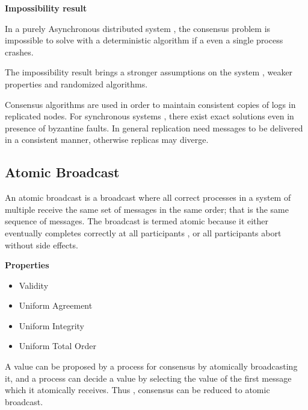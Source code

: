 \documentclass{article}
\begin{document}
\vspace{3mm}
\textbf{Impossibility result}

In a purely Asynchronous distributed system , the consensus problem is impossible to solve with a deterministic algorithm if a even a single process crashes.

The impossibility result brings a stronger assumptions on the system , weaker properties and randomized algorithms.

Consensus algorithms are used in order to maintain consistent copies of logs in replicated nodes. For synchronous systems , there exist exact solutions even in presence of byzantine faults.
In general replication need messages to be delivered in a consistent manner, otherwise replicas may diverge.

\subsection{Atomic Broadcast}

An atomic broadcast is a broadcast where all correct processes in a system of multiple receive the same set of messages in the same order; that is the same sequence of messages.
The broadcast is termed atomic because it either eventually completes correctly at all participants , or all participants abort without side effects.

\vspace{3mm}
\textbf{Properties}

\begin{itemize}
    \item Validity 
    \item Uniform Agreement 
    \item Uniform Integrity 
    \item Uniform Total Order 
\end{itemize}



A value can be proposed by a process for consensus by atomically broadcasting it, and a process can decide a value by selecting the value of the first message which it atomically receives. Thus , consensus can be reduced to atomic broadcast.
\end{document}
